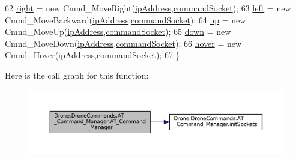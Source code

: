 \begin{DoxyCode}
62         \hyperlink{class_drone_1_1_drone_commands_1_1_a_t___command___manager_a9a8b81e3c9702e2eb996283f1e441c9a}{right} = \textcolor{keyword}{new} Cmnd\_MoveRight(\hyperlink{class_drone_1_1_drone_commands_1_1_a_t___command___manager_a69120034be279656eb27b5d321fe3f04}{ipAddress},\hyperlink{class_drone_1_1_drone_commands_1_1_a_t___command___manager_a6fc16b3f0b9db4ede77841c18c84cab0}{commandSocket});
63         \hyperlink{class_drone_1_1_drone_commands_1_1_a_t___command___manager_a0c85483dd42046af9882d140f8eb9d12}{left} = \textcolor{keyword}{new} Cmnd\_MoveBackward(\hyperlink{class_drone_1_1_drone_commands_1_1_a_t___command___manager_a69120034be279656eb27b5d321fe3f04}{ipAddress},\hyperlink{class_drone_1_1_drone_commands_1_1_a_t___command___manager_a6fc16b3f0b9db4ede77841c18c84cab0}{commandSocket});
64         \hyperlink{class_drone_1_1_drone_commands_1_1_a_t___command___manager_a2a050072c86dfbd84ee82696b59d366e}{up} = \textcolor{keyword}{new} Cmnd\_MoveUp(\hyperlink{class_drone_1_1_drone_commands_1_1_a_t___command___manager_a69120034be279656eb27b5d321fe3f04}{ipAddress},\hyperlink{class_drone_1_1_drone_commands_1_1_a_t___command___manager_a6fc16b3f0b9db4ede77841c18c84cab0}{commandSocket});
65         \hyperlink{class_drone_1_1_drone_commands_1_1_a_t___command___manager_a76f949b34a87e8577a41c02f410b97cc}{down} = \textcolor{keyword}{new} Cmnd\_MoveDown(\hyperlink{class_drone_1_1_drone_commands_1_1_a_t___command___manager_a69120034be279656eb27b5d321fe3f04}{ipAddress},\hyperlink{class_drone_1_1_drone_commands_1_1_a_t___command___manager_a6fc16b3f0b9db4ede77841c18c84cab0}{commandSocket});
66         \hyperlink{class_drone_1_1_drone_commands_1_1_a_t___command___manager_aafd47053f06ac149caa6e349f67906fb}{hover} = \textcolor{keyword}{new} Cmnd\_Hover(\hyperlink{class_drone_1_1_drone_commands_1_1_a_t___command___manager_a69120034be279656eb27b5d321fe3f04}{ipAddress},\hyperlink{class_drone_1_1_drone_commands_1_1_a_t___command___manager_a6fc16b3f0b9db4ede77841c18c84cab0}{commandSocket});
67     \}
\end{DoxyCode}


Here is the call graph for this function\+:\nopagebreak
\begin{figure}[H]
\begin{center}
\leavevmode
\includegraphics[width=350pt]{class_drone_1_1_drone_commands_1_1_a_t___command___manager_afcbb9940f1139a33dcd91cc906017c67_cgraph}
\end{center}
\end{figure}




